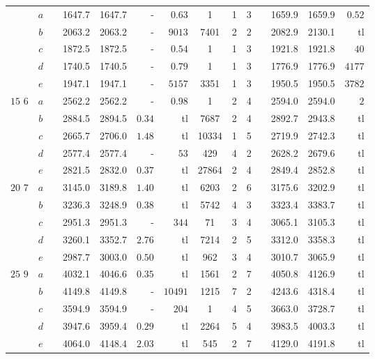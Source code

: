 \begin{table}[!htb]
\begin{tabular}{cccccrrccccccr}
& $a$ & & 1647.7 & 1647.7 & - & $0.63$ & 1 & 1 & 3 & & 1659.9 & 1659.9 & $0.52$ \\
& $b$ & & 2063.2 & 2063.2 & - & $9013$ & 7401 & 2 & 2 & & 2082.9 & 2130.1 & tl \\
& $c$ & & 1872.5 & 1872.5 & - & $0.54$ & 1 & 1 & 3 & & 1921.8 & 1921.8 & $40$ \\
& $d$ & & 1740.5 & 1740.5 & - & $0.79$ & 1 & 1 & 3 & & 1776.9 & 1776.9 & $4177$ \\
& $e$ & & 1947.1 & 1947.1 & - & $5157$ & 3351 & 1 & 3 & & 1950.5 & 1950.5 & $3782$ \\
\hline
\multirow{5}{*}{$15$  \hspace{5mm} $6$}
& $a$ & & 2562.2 & 2562.2 & - & $0.98$ & 1 & 2 & 4 & & 2594.0 & 2594.0 & $2$ \\
& $b$ & & 2884.5 & 2894.5 & $0.34$ & tl & 7687 & 2 & 4 & & 2892.7 & 2943.8 & tl \\
& $c$ & & 2665.7 & 2706.0 & $1.48$ & tl & 10334 & 1 & 5 & & 2719.9 & 2742.3 & tl \\
& $d$ & & 2577.4 & 2577.4 & - & $53$ & 429 & 4 & 2 & & 2628.2 & 2679.6 & tl \\
& $e$ & & 2821.5 & 2832.0 & $0.37$ & tl & 27864 & 2 & 4 & & 2849.4 & 2852.8 & tl \\
\hline
\multirow{5}{*}{$20$  \hspace{5mm} $7$}
& $a$ & & 3145.0 & 3189.8 & $1.40$ & tl & 6203 & 2 & 6 & & 3175.6 & 3202.9 & tl \\
& $b$ & & 3236.3 & 3248.9 & $0.38$ & tl & 5742 & 4 & 3 & & 3323.4 & 3383.7 & tl \\
& $c$ & & 2951.3 & 2951.3 & - & $344$ & 71 & 3 & 4 & & 3065.1 & 3105.3 & tl \\
& $d$ & & 3260.1 & 3352.7 & $2.76$ & tl & 7214 & 2 & 5 & & 3312.0 & 3358.3 & tl \\
& $e$ & & 2987.7 & 3003.0 & $0.50$ & tl & 962 & 3 & 4 & & 3010.7 & 3065.9 & tl \\
\hline
\multirow{5}{*}{$25$  \hspace{5mm} $9$}
& $a$ & & 4032.1 & 4046.6 & $0.35$ & tl & 1561 & 2 & 7 & & 4050.8 & 4126.9 & tl \\
& $b$ & & 4149.8 & 4149.8 & - & $10491$ & 1215 & 7 & 2 & & 4243.6 & 4318.4 & tl \\
& $c$ & & 3594.9 & 3594.9 & - & $204$ & 1 & 4 & 5 & & 3663.0 & 3728.7 & tl \\
& $d$ & & 3947.6 & 3959.4 & $0.29$ & tl & 2264 & 5 & 4 & & 3983.5 & 4003.3 & tl \\
& $e$ & & 4064.0 & 4148.4 & $2.03$ & tl & 545 & 2 & 7 & & 4129.0 & 4191.8 & tl \\

\end{tabular}
\end{table}
